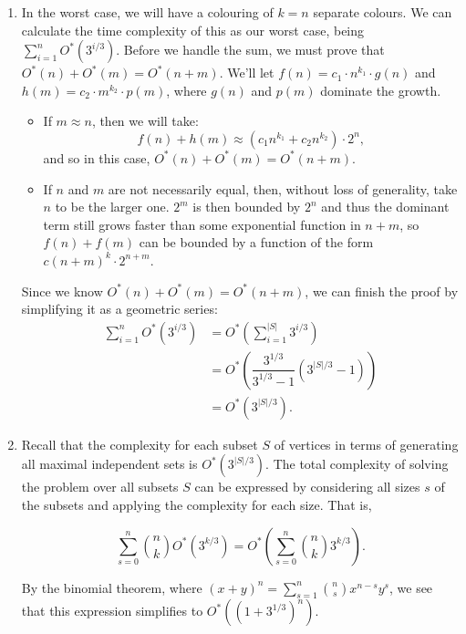 \documentclass{article}
\begin{document}
\begin{solution}
\begin{enumerate}[label = (\alph*)]
\begin{enumerate}[label = (\roman*)]
        \item In the worst case, we will have a colouring of $k = n$ separate colours. We can calculate the time complexity of this as our worst case, being $\displaystyle \sum_{i=1}^{n} O^*(3^{i/3})$. Before we handle the sum, we must prove that  $O^*(n)  + O^*(m) = O^*(n + m)$. We'll let $f(n) = c_1 \cdot n^{k_1} \cdot g(n)$ and $h(m) = c_2 \cdot m^{k_2} \cdot p(m)$, where $g(n)$ and $p(m)$ dominate the growth.
\begin{itemize}
	\item If $m \approx n$, then we will take: $$f(n) + h(m) \approx (c_1 n^{k_1} + c_2 n^{k_2})\cdot 2^n,$$ and so in this case, $O^*(n) + O^*(m) = O^*(n+m)$.
	\item If $n$ and $m$ are not necessarily equal, then, without loss of generality, take $n$ to be the larger one. $2^m$ is then bounded by $2^n$ and thus the dominant term still grows faster than some exponential function in $n+m$, so $f(n) + f(m)$ can be bounded by a function of the form $c(n+m)^k \cdot 2^{n+m}$.
\end{itemize}

Since we know $O^*(n)  + O^*(m) = O^*(n + m)$, we can finish the proof by simplifying it as a geometric series:
\begin{align*}
	\sum_{i=1}^{n} O^*(3^{i/3}) &= O^* \left( \sum_{i=1}^{|S|} 3^{i/3}\right)\\
&= O^* \left(\dfrac{3^{1/3}}{3^{1/3}-1} (3^{|S|/3} - 1)\right)\\
&= O^* \left(3^{|S|/3}\right).
\end{align*}
        \item Recall that the complexity for each subset $S$ of vertices in terms of generating all maximal independent sets is $O^*(3^{|S|/3})$. The total complexity of solving the problem over all subsets $S$ can be expressed by considering all sizes $s$ of the subsets and applying the complexity for each size. That is,

$$\sum_{s=0}^n \binom{n}{k}O^*(3^{k/3}) = O^* \left( \sum_{s=0}^n \binom{n}{k} 3^{k/3} \right).$$

By the binomial theorem, where $\displaystyle (x+y)^n = \sum_{s=1}^n \binom{n}{s}x^{n-s}y^{s}$, we see that this expression simplifies to $O^*\left( (1 + 3^{1/3})^n\right)$.


    \end{enumerate}
\end{enumerate}
\end{solution}
\end{document}
